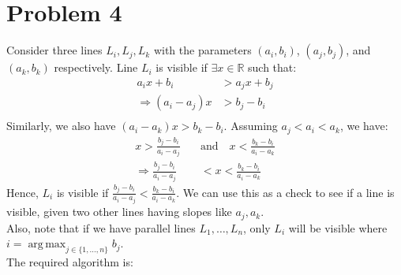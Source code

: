 \documentclass{article}
\DeclareMathOperator*{\argmax}{arg\,max}
\begin{document}
\section{Problem 4}
  Consider three lines $L_i, L_j, L_k$ with the parameters $(a_i, b_i)$, $(a_j, b_j)$, and $(a_k, b_k)$ respectively.
  Line $L_i$ is visible if $\exists x \in \mathbb{R}$ such that:
  \begin{align*}
    a_i x + b_i &> a_j x + b_j \\
    \Rightarrow (a_i - a_j) x &> b_j - b_i \\
  \end{align*}
  Similarly, we also have $(a_i - a_k) x > b_k - b_i$.
  Assuming $a_j < a_i < a_k$, we have:
  \begin{align*}
    x > \frac{b_j - b_i}{a_i - a_j} \quad &\text{and} \quad x < \frac{b_k - b_i}{a_i - a_k} \\
    \Rightarrow \frac{b_j - b_i}{a_i - a_j} &< x < \frac{b_k - b_i}{a_i - a_k}
  \end{align*}
  Hence, $L_i$ is visible if $\frac{b_j - b_i}{a_i - a_j} < \frac{b_k - b_i}{a_i - a_k}$.
  We can use this as a check to see if a line is visible, given two other lines having slopes like $a_j, a_k$. \\
  Also, note that if we have parallel lines $L_1, \ldots, L_n$, only $L_i$ will be visible where $i = \argmax_{j \in \{1, \ldots, n\}} b_j$. \\
  The required algorithm is:
\end{document}
